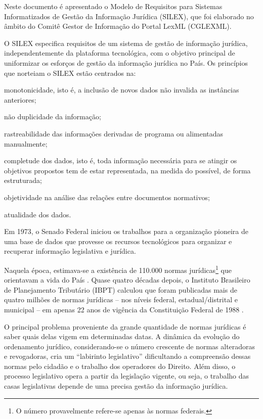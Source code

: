 \documentclass[a4paper,11pt,openright,twoside,english,brazil]{abntex2}
\begin{document}
Neste documento é apresentado o Modelo de Requisitos para Sistemas 
Informatizados de Gestão da Informação Jurídica (SILEX), que foi elaborado no 
âmbito do Comitê Gestor de Informação do
Portal LexML (CGLEXML).

O SILEX especifica requisitos de um sistema de gestão de informação jurídica,
independentemente da plataforma tecnológica, com o objetivo principal de
uniformizar os esforços de gestão da informação jurídica no País.
Os princípios que norteiam o SILEX estão centrados na:

\begin{alineas}

 \item monotonicidade, isto é, a inclusão de novos dados não invalida as
 instâncias anteriores;
 
 \item não duplicidade da informação;
 
 \item rastreabilidade das informações derivadas de programa ou alimentadas
 manualmente;
 
 \item completude dos dados, isto é, toda informação necessária para se atingir
 os objetivos propostos tem de estar representada, na medida do possível, de
 forma estruturada;
 
 \item objetividade na análise das relações entre documentos normativos;
 
 \item atualidade dos dados.
 
\end{alineas}

Em 1973, o Senado Federal iniciou os trabalhos para a organização pioneira de
uma base de dados que provesse os recursos tecnológicos para organizar e
recuperar informação legislativa e jurídica.

Naquela época, estimava-se a existência de 110.000 normas jurídicas\footnote{O
número provavelmente refere-se apenas às normas federais.} que orientavam a vida
do País \cite{filipi1971}. Quase quatro décadas depois, o Instituto Brasileiro
de Planejamento Tributário (IBPT) calculou que foram publicadas mais de quatro
milhões de normas jurídicas -- nos níveis federal, estadual/distrital e
municipal -- em apenas 22 anos de vigência da Constituição Federal de 1988
\cite{estudo2010}.

O principal problema proveniente da grande quantidade de normas jurídicas é
saber quais delas vigem em determinadas datas. A dinâmica da evolução do
ordenamento jurídico, considerando-se o número crescente de normas alteradoras e
revogadoras, cria um ``labirinto legislativo'' \cite{wald1969} dificultando a
compreensão dessas normas pelo cidadão e o trabalho dos operadores do Direito.
Além disso, o processo legislativo opera a partir da legislação vigente, ou
seja, o trabalho das casas legislativas depende de uma precisa gestão da
informação jurídica.
\end{document}
